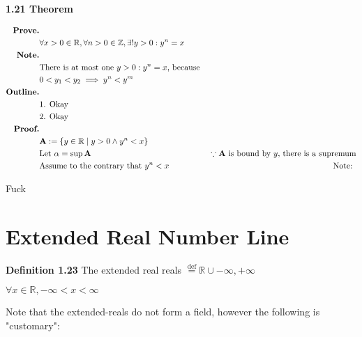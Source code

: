 \documentclass{article}
\newcommand{\set}[2]{
	\{ #1 \mid #2 \}
}
\newcommand{\defeq}{\stackrel{\text{def}}{=}}
\begin{document}
  \subsection{}


  {\bf 1.21 Theorem}

  \begin{align*}
    \text{\bf Prove.} \\
      & \forall x > 0 \in \mathbb{R}, \forall n > 0 \in \mathbb{Z}, \exists! y > 0 : y^n = x \\
    \text{\bf Note.} \\
      & \text{There is at most one $y > 0 : y^n = x$, because } \\
      & 0 < y_1 < y_2 \implies y^n < y^m \\
    \text{\bf Outline.} \\
      & \text{1. Okay} \\
      & \text{2. Okay} \\
    \text{\bf Proof.} \\
      & \mathbf{A} := \set{y \in \mathbb{R}}{ y > 0 \land y^n < x } \\
      & \text{Let } \alpha = \sup\mathbf{A} & \because \text{$\mathbf{A}$ is bound by $y$, there is a supremum} \\
      & \text{Assume to the contrary that $y^n < x$} & \text{Note: }\\
  \end{align*}

  Fuck



  \pagebreak

  \section{Extended Real Number Line}

  {\noindent \bf Definition 1.23}\label{def-1-23} The extended real reals $\defeq \mathbb{R} \cup { -\infty, +\infty } $ 

  {\noindent} $ \forall x \in \mathbb{R}, -\infty < x < \infty $

  Note that the extended-reals do not form a field, however the following is "customary":
\end{document}
